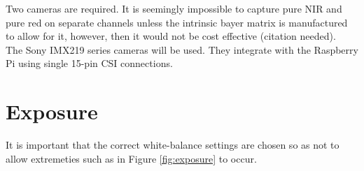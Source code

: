 Two cameras are required. It is seemingly impossible to capture pure NIR and pure red on separate channels unless the intrinsic bayer matrix is manufactured to allow for it, however, then it would not be cost effective (citation needed).\\

The Sony IMX219 series cameras will be used. They integrate with the Raspberry Pi using single 15-pin CSI connections.

\section{Exposure}

It is important that the correct white-balance settings are chosen so as not to allow extremeties such as in Figure \ref{fig:exposure} to occur.

